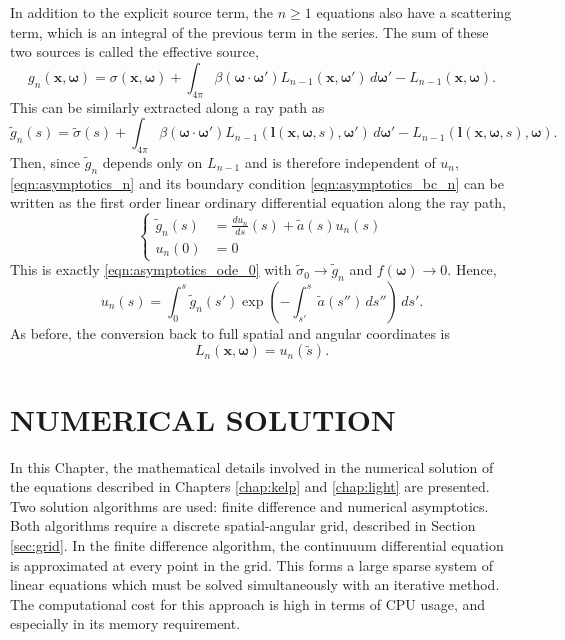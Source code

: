 \documentclass[ms,cpyr,lof,lot]{uathesis}
\renewcommand\vec\bm
\begin{document}
In addition to the explicit source term, the  $n \geq 1$ equations also have a scattering term, which is an integral of the previous term in the series. The sum of these two sources is called the effective source,
\begin{equation*}
  g_n(\vec{x}, \vec{\omega}) = \sigma(\vec{x}, \vec{\omega}) + \int_{4\pi} \beta(\vec{\omega}\cdot\vec{\omega}')
  L_{n-1}(\vec{x}, \vec{\omega}')\,d\vec{\omega}' - L_{n-1}(\vec{x}, \vec{\omega}).
\end{equation*}
This can be similarly extracted along a ray path as
\begin{equation*}
  \tilde{g}_n(s) = \tilde{\sigma}(s) + \int_{4\pi} \beta(\vec{\omega}\cdot\vec{\omega}')
  L_{n-1}(\vec{l}(\vec{x}, \vec{\omega}, s), \vec{\omega}')\,d\vec{\omega}' - L_{n-1}(\vec{l}(\vec{x}, \vec{\omega}, s), \vec{\omega}).
\end{equation*}
Then, since $\tilde{g}_n$ depends only on $L_{n-1}$ and is therefore independent of $u_n$, \eqref{eqn:asymptotics_n} and its boundary condition \eqref{eqn:asymptotics_bc_n} can be written as the first order linear ordinary differential equation along the ray path,
\begin{equation}
  \left\{
  \begin{aligned}
    \tilde{g}_n(s) &= \frac{du_n}{ds}(s) + \tilde{a}(s)u_n(s) \\
    u_n(0) &= 0
  \end{aligned}
  \right.
  \label{eqn:asymptotics_ode_n}
\end{equation}
This is exactly \eqref{eqn:asymptotics_ode_0} with $\tilde{\sigma}_0 \to \tilde{g}_n$ and $f(\vec{\omega}) \to 0$.
Hence,
\begin{equation}
  u_n(s) = \int_0^s\tilde{g}_n(s')\exp\left( -\int_{s'}^{s}\tilde{a}(s'')\,ds'' \right)\, ds'.
  \label{eqn:asymptotics_soln_n}
\end{equation}
As before, the conversion back to full spatial and angular coordinates is
\begin{equation*}
  L_n(\vec{x}, \vec{\omega}) = u_n(\tilde{s}).
\end{equation*}

\chapter{NUMERICAL SOLUTION}
\label{chap:numerical}
In this Chapter, the mathematical details involved in the numerical solution of the equations described in Chapters \ref{chap:kelp} and \ref{chap:light} are presented.
Two solution algorithms are used: finite difference and numerical asymptotics.
Both algorithms require a discrete spatial-angular grid, described in Section \ref{sec:grid}.
In the finite difference algorithm, the continuuum differential equation is approximated at every point in the grid.
This forms a large sparse system of linear equations which must be solved simultaneously with an iterative method.
The computational cost for this approach is high in terms of CPU usage, and especially in its memory requirement.
\end{document}
